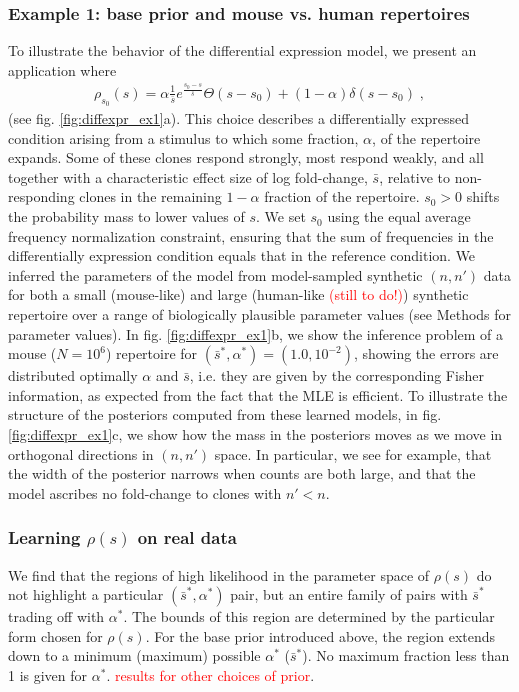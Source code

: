 \documentclass[letterpaper,english,prl,reprint,longbibliography]{revtex4-1} %
\newcommand{\re}[1]{\textcolor{red}{#1}}
\begin{document}
\subsubsection*{Example 1: base prior and mouse vs. human repertoires}
To illustrate the behavior of the differential expression model, we present an application where
\begin{align}
	\rho_{s_0}(s)=\alpha\frac{1}{\bar{s}}e^{\frac{s_0-s}{\bar{s}}} \Theta(s-s_0)+(1-\alpha)\delta(s-s_0)\;, \label{eq:Ps_ex1}
\end{align} 
(see fig. \ref{fig:diffexpr_ex1}a). 
This choice describes a differentially expressed condition arising from a stimulus to which some fraction, $\alpha$, of the repertoire expands. 
Some of these clones respond strongly, most respond weakly, and all together with a characteristic effect size of log fold-change, $\bar{s}$, relative to non-responding clones in the remaining $1-\alpha$ fraction of the repertoire. 
$s_0>0$ shifts the probability mass to lower values of $s$. 
We set $s_0$ using the equal average frequency normalization constraint, ensuring that the sum of frequencies in the differentially expression condition equals that in the reference condition.
We inferred the parameters of the model from model-sampled synthetic $(n,n')$ data for both a small (mouse-like) and large (human-like \textcolor{red}{(still to do!)}) synthetic repertoire over a range of biologically plausible parameter values (see Methods for parameter values). 
In fig. \ref{fig:diffexpr_ex1}b, we show the inference problem of a mouse ($N=10^{6}$) repertoire for $(\bar{s}^*,\alpha^* )=(1.0,10^{-2})$, showing the errors are distributed optimally $\alpha$ and $\bar{s}$, i.e. they are given by the corresponding Fisher information, as expected from the fact that the MLE is efficient. To illustrate the structure of the posteriors computed from these learned models, in fig.\ref{fig:diffexpr_ex1}c, we show how the mass in the posteriors moves as we move in orthogonal directions in $(n,n')$ space. In particular, we see for example, that the width of the posterior narrows when counts are both large, and that the model ascribes no fold-change to clones with $n'< n$.

\subsubsection*{Learning $\rho(s)$ on real data}
We find that the regions of high likelihood in the parameter space of $\rho(s)$ do not highlight a particular $(\bar{s}^*,\alpha^*)$ pair, but an entire family of pairs with $\bar{s}^*$ trading off with $\alpha^*$. The bounds of this region are determined by the particular form chosen for $\rho(s)$. For the base prior introduced above, the region extends down to a minimum (maximum) possible $\alpha^*$ ($\bar{s}^*$). No maximum fraction less than 1 is given for $\alpha^*$. \re{results for other choices of prior}. 
\end{document}

